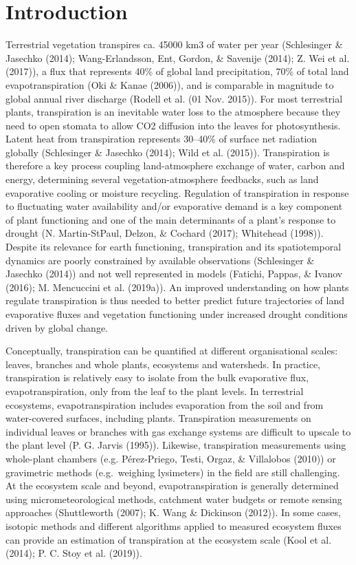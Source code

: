 \documentclass[11pt,twoside]{reedthesis}
\begin{document}
\newpage

\section{Introduction}\label{introduction}

Terrestrial vegetation transpires ca. 45000 km3 of water per year
(Schlesinger \& Jasechko (2014); Wang-Erlandsson, Ent, Gordon, \&
Savenije (2014); Z. Wei et al. (2017)), a flux that represents 40\% of
global land precipitation, 70\% of total land evapotranspiration (Oki \&
Kanae (2006)), and is comparable in magnitude to global annual river
discharge (Rodell et al. (01 Nov. 2015)). For most terrestrial plants,
transpiration is an inevitable water loss to the atmosphere because they
need to open stomata to allow CO2 diffusion into the leaves for
photosynthesis. Latent heat from transpiration represents 30--40\% of
surface net radiation globally (Schlesinger \& Jasechko (2014); Wild et
al. (2015)). Transpiration is therefore a key process coupling
land-atmosphere exchange of water, carbon and energy, determining
several vegetation-atmosphere feedbacks, such as land evaporative
cooling or moisture recycling. Regulation of transpiration in response
to fluctuating water availability and/or evaporative demand is a key
component of plant functioning and one of the main determinants of a
plant's response to drought (N. Martin-StPaul, Delzon, \& Cochard
(2017); Whitehead (1998)). Despite its relevance for earth functioning,
transpiration and its spatiotemporal dynamics are poorly constrained by
available observations (Schlesinger \& Jasechko (2014)) and not well
represented in models (Fatichi, Pappas, \& Ivanov (2016); M. Mencuccini
et al. (2019a)). An improved understanding on how plants regulate
transpiration is thus needed to better predict future trajectories of
land evaporative fluxes and vegetation functioning under increased
drought conditions driven by global change.\par

Conceptually, transpiration can be quantified at different
organisational scales: leaves, branches and whole plants, ecosystems and
watersheds. In practice, transpiration is relatively easy to isolate
from the bulk evaporative flux, evapotranspiration, only from the leaf
to the plant levels. In terrestrial ecosystems, evapotranspiration
includes evaporation from the soil and from water-covered surfaces,
including plants. Transpiration measurements on individual leaves or
branches with gas exchange systems are difficult to upscale to the plant
level (P. G. Jarvis (1995)). Likewise, transpiration measurements using
whole-plant chambers (e.g. Pérez-Priego, Testi, Orgaz, \& Villalobos
(2010)) or gravimetric methods (e.g.~weighing lysimeters) in the field
are still challenging. At the ecosystem scale and beyond,
evapotranspiration is generally determined using micrometeorological
methods, catchment water budgets or remote sensing approaches
(Shuttleworth (2007); K. Wang \& Dickinson (2012)). In some cases,
isotopic methods and different algorithms applied to measured ecosystem
fluxes can provide an estimation of transpiration at the ecosystem scale
(Kool et al. (2014); P. C. Stoy et al. (2019)).\par
\end{document}

